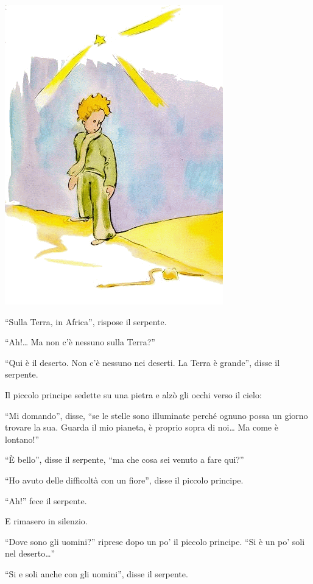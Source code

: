 \documentclass[11pt]{scrbook}
\begin{document}
\begin{center}
\includegraphics{img/17a}
\end{center}

``Sulla Terra, in Africa'', rispose il serpente.

``Ah!\ldots{} Ma non c'è nessuno sulla Terra?''

``Qui è il deserto. Non c'è nessuno nei deserti. La Terra è grande'', disse il serpente.

Il piccolo principe sedette su una pietra e alzò gli occhi verso il cielo:

``Mi domando'', disse, ``se le stelle sono illuminate perché ognuno possa un giorno trovare la sua. Guarda il mio pianeta, è proprio sopra di noi\ldots{} Ma come è lontano!''

``È bello'', disse il serpente, ``ma che cosa sei venuto a fare qui?''

``Ho avuto delle difficoltà con un fiore'', disse il piccolo principe.

``Ah!'' fece il serpente.

E rimasero in silenzio.

``Dove sono gli uomini?'' riprese dopo un po' il piccolo principe. ``Si è un po' soli nel deserto\ldots{}''

``Si e soli anche con gli uomini'', disse il serpente.
\end{document}
